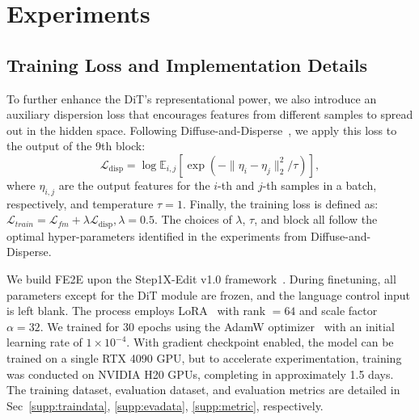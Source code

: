 \documentclass{article} %
\begin{document}
\section{Experiments}
\subsection{Training Loss and Implementation Details} 
To further enhance the DiT's representational power, we also introduce an auxiliary dispersion loss that encourages features from different samples to spread out in the hidden space. Following Diffuse-and-Disperse~\citep{disperse}, we apply this loss to the output of the 9th block:
\begin{equation}
\label{eq:loss_disperse}
\mathcal{L}_{\text {disp}}=\log \mathbb{E}_{i, j}\left[\exp(-\|\eta_{i}-\eta_{j}\|_{2}^{2}/ \tau) \right],
\end{equation}
where $\eta_{i,j}$ are the output features for the $i$-th and $j$-th samples in a batch, respectively, and temperature $\tau=1$. Finally, the training loss is defined as: $\mathcal{L}_{train} = \mathcal{L}_{fm} + \lambda \mathcal{L}_{\text {disp}}, \lambda=0.5$. The choices of $\lambda$, $\tau$, and block all follow the optimal hyper-parameters identified in the experiments from Diffuse-and-Disperse.

We build FE2E upon the Step1X-Edit v1.0 framework~\citep{step}. During finetuning, all parameters except for the DiT module are frozen, and the language control input is left blank. The process employs LoRA~\citep{lora} with rank $=64$ and scale factor $\alpha=32$. We trained for 30 epochs using the AdamW optimizer~\citep{adamw} with an initial learning rate of $1 \times 10^{-4}$. With gradient checkpoint enabled, the model can be trained on a single RTX 4090 GPU, but to accelerate experimentation, training was conducted on NVIDIA H20 GPUs, completing in approximately 1.5 days. The training dataset, evaluation dataset, and evaluation metrics are detailed in Sec~\ref{supp:traindata}, \ref{supp:evadata}, \ref{supp:metric}, respectively.
\vspace{-1em}
\end{document}
